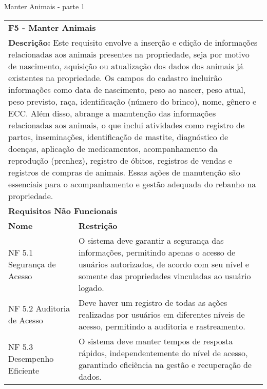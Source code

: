 \begin{tabframed}[!htb]

  \caption{Manter Animais - parte 1}
  \label{quad:requisitoManterAnimais}
  \renewcommand{\arraystretch}{1.5}
  \begin{tabular}{|l|l|}
    \cline{1-2}
    \multicolumn{2}{|l|}{\textbf{F5 - Manter Animais}}
    \\ \cline{1-2}

    \multicolumn{2}{|p{15cm}|}{
    \raggedright \textbf{Descrição:} Este requisito envolve a inserção e edição de informações relacionadas aos animais presentes na propriedade, seja por motivo de nascimento, aquisição ou atualização dos dados dos animais já existentes na propriedade. Os campos do cadastro incluirão informações como data de nascimento, peso ao nascer, peso atual, peso previsto, raça, identificação (número do brinco), nome, gênero e \gls{ECC}.
    Além disso, abrange a manutenção das informações relacionadas aos animais, o que inclui atividades como registro de partos, inseminações, identificação de mastite, diagnóstico de doenças, aplicação de medicamentos, acompanhamento da reprodução (prenhez), registro de óbitos, registros de vendas e registros de compras de animais. Essas ações de manutenção são essenciais para o acompanhamento e gestão adequada do rebanho na propriedade.
    }
    \\ \cline{1-2}

    \multicolumn{2}{|l|}{\textbf{Requisitos Não Funcionais}}
    \\ \cline{1-2}

    \textbf{Nome}                             &
    \textbf{Restrição}
    \\ \cline{1-2}
    \multicolumn{1}{|p{3cm}|}{\raggedright NF 5.1 Segurança de Acesso}                &
    \multicolumn{1}{|p{12cm}|}{\raggedright O sistema deve garantir a segurança das informações, permitindo apenas o acesso de usuários autorizados, de acordo com seu nível e somente das propriedades vinculadas ao usuário logado.}
    \\ \cline{1-2}

    \multicolumn{1}{|p{3cm}|}{\raggedright NF 5.2 Auditoria de Acesso}   &
    \multicolumn{1}{|p{12cm}|}{\raggedright Deve haver um registro de todas as ações realizadas por usuários em diferentes níveis de acesso, permitindo a auditoria e rastreamento.}
    \\ \cline{1-2}

    \multicolumn{1}{|p{3.2cm}|}{\raggedright NF 5.3 Desempenho Eficiente}   &
    \multicolumn{1}{|p{12cm}|}{\raggedright O sistema deve manter tempos de resposta rápidos, independentemente do nível de acesso, garantindo eficiência na gestão e recuperação de dados.}
    \\ \cline{1-2}


\end{tabular}
\end{tabframed}
